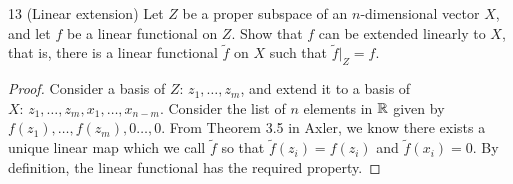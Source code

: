 \begin{exercise}{13 (Linear extension)}
Let $Z$ be a proper subspace of an $n$-dimensional vector $X$, and let $f$ be a linear functional on $Z$.
Show that $f$ can be extended linearly to $X$, that is, there is a linear functional $\tilde{f}$ on $X$ such that $\tilde{f}|_Z=f$.
\end{exercise}
\begin{proof}
Consider a basis of $Z$: $z_1,\dots,z_m$, and extend it to a basis of \\
$X$: $z_1,\dots,z_m,x_1,\dots,x_{n-m}$.
Consider the list of $n$ elements in $\mathbb{R}$ given by $f(z_1),\dots,f(z_m),0\dots,0$.
From Theorem 3.5 in Axler, we know there exists a unique linear map which we call $\tilde{f}$ so that $\tilde{f}(z_i)=f(z_i)$ and $\tilde{f}(x_i)=0$.
By definition, the linear functional has the required property.
\end{proof}
